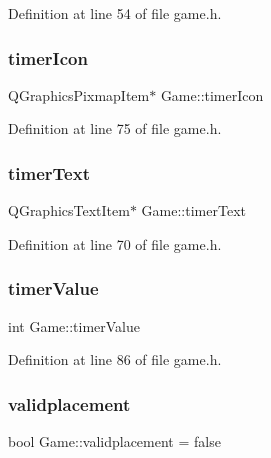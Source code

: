 Definition at line 54 of file game.\+h.

\mbox{\label{class_game_a5853a185c9981da12d5a6330c5f121c7}} 
\subsubsection{\texorpdfstring{timer\+Icon}{timerIcon}}
{\footnotesize\ttfamily Q\+Graphics\+Pixmap\+Item$\ast$ Game\+::timer\+Icon}



Definition at line 75 of file game.\+h.

\mbox{\label{class_game_a21d038c2747c61d3b5a2a3d8f1764086}} 
\subsubsection{\texorpdfstring{timer\+Text}{timerText}}
{\footnotesize\ttfamily Q\+Graphics\+Text\+Item$\ast$ Game\+::timer\+Text}



Definition at line 70 of file game.\+h.

\mbox{\label{class_game_aef6faf2c7e350578fea82f340353fa6b}} 
\subsubsection{\texorpdfstring{timer\+Value}{timerValue}}
{\footnotesize\ttfamily int Game\+::timer\+Value}



Definition at line 86 of file game.\+h.

\mbox{\label{class_game_a06579845b7a93d8bf40efe5e7592b601}} 
\subsubsection{\texorpdfstring{validplacement}{validplacement}}
{\footnotesize\ttfamily bool Game\+::validplacement = false}



